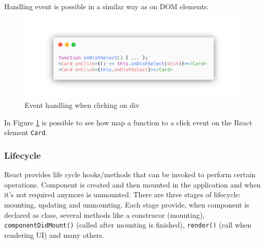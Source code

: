 Handling event is possible in a similar way as on DOM elements:

\begin{figure}[h]
    \includegraphics[width=\textwidth]{assets/react-event-handling.png}
    \caption{Event handling when clicking on div}
    \label{fig:event-handling}
\end{figure}

In Figure \ref{fig:event-handling} is possible to see how map a function to a click event on the React element \texttt{Card}.

\subsubsection*{Lifecycle}
React provides life cycle hooks/methods that can be invoked to perform certain operations. Component is created and then mounted in the application and when it's not required anymore is unmounted. There are three stages of lifecycle: mounting, updating and unmounting. Each stage provide, when component is declared as class, several methods like a construcor (mounting), \texttt{componentDidMount()} (called after mounting is finished), \texttt{render()} (call when rendering UI) and many others.

